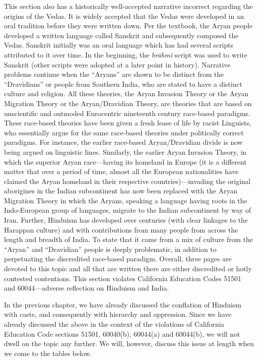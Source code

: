 This section also has a historically well-accepted narrative incorrect regarding the origins of the Vedas. It is widely accepted that the Vedas were developed in an oral tradition before they were written down. Per the textbook, the Aryan people developed a written language called Sanskrit and subsequently composed the Vedas. Sanskrit initially was an oral language which has had several scripts attributed to it over time. In the beginning, the \textit{brāhmi} script was used to write Sanskrit (other scripts were adopted at a later point in history). Narrative problems continue when the “Aryans” are shown to be distinct from the “Dravidians” or people from Southern India, who are stated to have a distinct culture and religion. All these theories, the Aryan Invasion Theory or the Aryan Migration Theory or the Aryan/Dravidian Theory, are theories that are based on unscientific and outmoded Eurocentric nineteenth century race-based paradigms. These race-based theories have been given a fresh lease of life by racist Linguists, who essentially argue for the same race-based theories under politically correct paradigms. For instance, the earlier race-based Aryan/Dravidian divide is now being argued on linguistic lines. Similarly, the earlier Aryan Invasion Theory, in which the superior Aryan race—having its homeland in Europe (it is a different matter that over a period of time, almost all the European nationalities have claimed the Aryan homeland in their respective countries)—invading the original aborigines in the Indian subcontinent has now been replaced with the Aryan Migration Theory in which the Aryans, speaking a language having roots in the Indo-European group of languages, migrate to the Indian subcontinent by way of Iran. Further, Hinduism has developed over centuries (with clear linkages to the Harappan culture) and with contributions from many people from across the length and breadth of India. To state that it came from a mix of culture from the “Aryan” and “Dravidian” people is deeply problematic, in addition to perpetuating the discredited race-based paradigm. Overall, three pages are devoted to this topic and all that are written there are either discredited or hotly contested contentions. This section violates California Education Codes 51501 and 60044—adverse reflection on Hinduism and India.  

In the previous chapter, we have already discussed the conflation of Hinduism with caste, and consequently with hierarchy and oppression. Since we have already discussed the above in the context of the violations of California Education Code sections 51501, 60040(b), 60044(a) and 60044(b), we will not dwell on the topic any further. We will, however, discuss this issue at length when we come to the tables below.  

